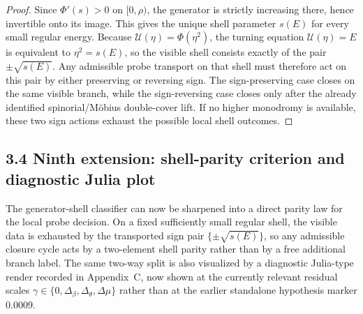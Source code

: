 \begin{proof}
Since $\Phi'(s)>0$ on $[0,\rho)$, the generator is strictly increasing there, hence invertible onto its image. This gives the unique shell parameter $s(E)$ for every small regular energy. Because $\mathcal U(\eta)=\Phi(\eta^2)$, the turning equation $\mathcal U(\eta)=E$ is equivalent to $\eta^2=s(E)$, so the visible shell consists exactly of the pair $\pm\sqrt{s(E)}$. Any admissible probe transport on that shell must therefore act on this pair by either preserving or reversing sign. The sign-preserving case closes on the same visible branch, while the sign-reversing case closes only after the already identified spinorial/M\"obius double-cover lift. If no higher monodromy is available, these two sign actions exhaust the possible local shell outcomes.
\end{proof}



\subsection*{3.4 Ninth extension: shell-parity criterion and diagnostic Julia plot}
The generator-shell classifier can now be sharpened into a direct parity law for the local probe decision. On a fixed sufficiently small regular shell, the visible data is exhausted by the transported sign pair $\{\pm\sqrt{s(E)}\}$, so any admissible closure cycle acts by a two-element shell parity rather than by a free additional branch label. The same two-way split is also visualized by a diagnostic Julia-type render recorded in Appendix~C, now shown at the currently relevant residual scales $\gamma\in\{0,\Delta_\beta,\Delta_\theta,\Delta\mu\}$ rather than at the earlier standalone hypothesis marker $0.0009$.

